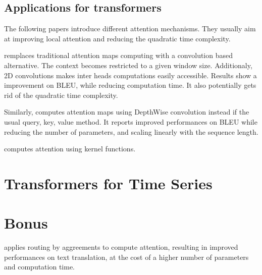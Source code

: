 \documentclass{article}
\begin{document}
    \subsection{Applications for transformers}
    The following papers introduce different attention mechanisms. They usually aim at improving local attention and reducing the quadratic time complexity.

    \cite{Yang2019ConvolutionalSN} remplaces traditional attention maps computing with a convolution based alternative. The context becomes restricted to a given window size. Additionaly, 2D convolutions makes inter heads computations easily accessible. Results show a improvement on BLEU, while reducing computation time. It also potentially gets rid of the quadratic time complexity.

    Similarly, \cite{Wu2019PayLA} computes attention maps using DepthWise convolution instead if the usual query, key, value method. It reports improved performances on BLEU while reducing the number of parameters,
    and scaling linearly with the sequence length.

    \cite{Tsai2019TransformerDA} computes attention using kernel functions.
    
    

\section{Transformers for Time Series}

\section{Bonus}

    \cite{Li2019InformationAF} applies routing by aggreements to compute attention, resulting in improved performances on text translation, at the cost of a higher number of parameters and computation time.




\end{document}
